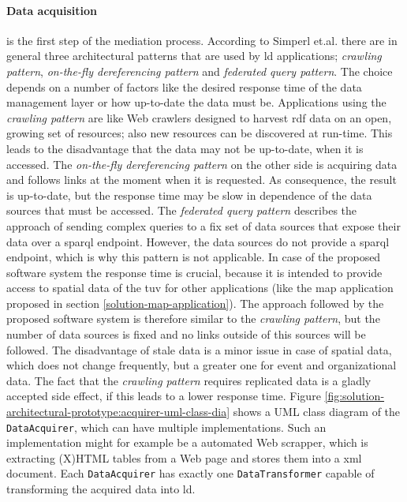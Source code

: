 \documentclass[draft,final]{vutinfth} %
\begin{document}
\paragraph{Data acquisition} is the first step of the mediation process. According to Simperl et.al.\cite{simperl_using_2013} \cite{heath_linked_2011} there are in general three architectural patterns that are used by \gls{ld} applications; \textit{crawling pattern}, \textit{on-the-fly dereferencing pattern} and \textit{federated query pattern}.  The choice depends on a number of factors like the desired response time of the data management layer or how up-to-date the data must be. Applications using the \textit{crawling pattern} are like Web crawlers designed to harvest \gls{rdf} data on an open, growing set of resources; also new resources can be discovered at run-time. This leads to the disadvantage that the data may not be up-to-date, when it is accessed. The \textit{on-the-fly dereferencing pattern} on the other side is acquiring data and follows links at the moment when it is requested. As consequence, the result is up-to-date, but the response time may be slow in dependence of the data sources that must be accessed. The \textit{federated query pattern} describes the approach of sending complex queries to a fix set of data sources that expose their data over a \gls{sparql} endpoint. However, the data sources do not provide a \gls{sparql} endpoint, which is why this pattern is not applicable. In case of the proposed software system the response time is crucial, because it is intended to provide access to spatial data of the \gls{tuv} for other applications (like the map application proposed in section \ref{solution-map-application}). The approach followed by the proposed software system is therefore similar to the \textit{crawling pattern}, but the number of data sources is fixed and no links outside of this sources will be followed. The disadvantage of stale data is a minor issue in case of spatial data, which does not change frequently, but a greater one for event and organizational data. The fact that the \textit{crawling pattern} requires replicated data is a gladly accepted side effect, if this leads to a lower response time. Figure \ref{fig:solution-architectural-prototype:acquirer-uml-class-dia} shows a UML class diagram of the \texttt{DataAcquirer}, which can have multiple implementations. Such an implementation might for example be a automated Web scrapper, which is extracting (X)HTML tables from a Web page and stores them into a \gls{xml} document. Each \texttt{DataAcquirer} has exactly one \texttt{DataTransformer} capable of transforming the acquired data into \gls{ld}.
\end{document}
